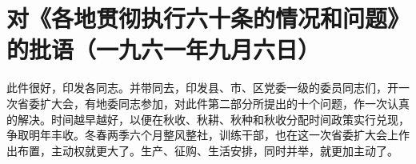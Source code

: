 \section{对《各地贯彻执行六十条的情况和问题》的批语（一九六一年九月六日）}


此件很好，印发各同志。并带同去，印发县、市、区党委一级的委员同志们，开一次省委扩大会，有地委同志参加，对此件第二部分所提出的十个问题，作一次认真的解决。时间越早越好，以便在秋收、秋耕、秋种和秋收分配时间政策实行兑现，争取明年丰收。冬春两季六个月整风整社，训练干部，也在这一次省委扩大会上作出布置，主动权就更大了。生产、征购、生活安排，同时并举，就更加主动了。


